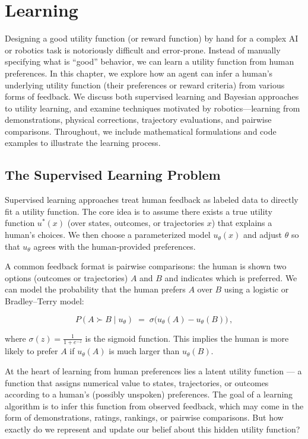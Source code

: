 \documentclass[
  letterpaper,
  numbers=noenddot,
  DIV=11]{scrreprt}
\let\oldchapter\chapter
\def\chapter{%
  \setcounter{sidenote}{1}%
  \oldchapter
}
\theoremstyle{plain}
\theoremstyle{definition}
\theoremstyle{remark}
\begin{document}

\chapter{Learning}\label{learning-1}

Designing a good utility function (or reward function) by hand for a
complex AI or robotics task is notoriously difficult and error-prone.
Instead of manually specifying what is ``good'' behavior, we can learn a
utility function from human preferences. In this chapter, we explore how
an agent can infer a human's underlying utility function (their
preferences or reward criteria) from various forms of feedback. We
discuss both supervised learning and Bayesian approaches to utility
learning, and examine techniques motivated by robotics---learning from
demonstrations, physical corrections, trajectory evaluations, and
pairwise comparisons. Throughout, we include mathematical formulations
and code examples to illustrate the learning process.

\section{The Supervised Learning
Problem}\label{the-supervised-learning-problem}

Supervised learning approaches treat human feedback as labeled data to
directly fit a utility function. The core idea is to assume there exists
a true utility function \(u^*(x)\) (over states, outcomes, or
trajectories \(x\)) that explains a human's choices. We then choose a
parameterized model \(u_\theta(x)\) and adjust \(\theta\) so that
\(u_\theta\) agrees with the human-provided preferences.

A common feedback format is pairwise comparisons: the human is shown two
options (outcomes or trajectories) \(A\) and \(B\) and indicates which
is preferred. We can model the probability that the human prefers \(A\)
over \(B\) using a logistic or Bradley--Terry model:

\[
P(A \succ B \mid u_\theta) \;=\; \sigma\!\Big(u_\theta(A) - u_\theta(B)\Big)\,,
\]

where \(\sigma(z)=\frac{1}{1+e^{-z}}\) is the sigmoid function. This
implies the human is more likely to prefer \(A\) if \(u_\theta(A)\) is
much larger than \(u_\theta(B)\).

At the heart of learning from human preferences lies a latent utility
function --- a function that assigns numerical value to states,
trajectories, or outcomes according to a human's (possibly unspoken)
preferences. The goal of a learning algorithm is to infer this function
from observed feedback, which may come in the form of demonstrations,
ratings, rankings, or pairwise comparisons. But how exactly do we
represent and update our belief about this hidden utility function?
\end{document}

